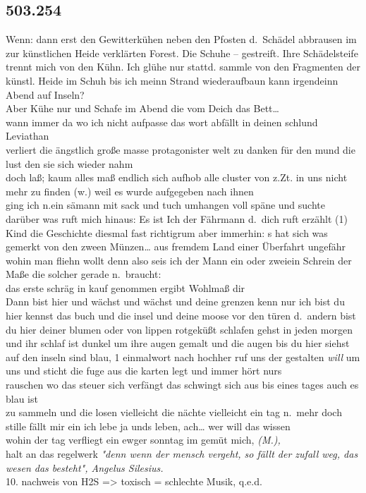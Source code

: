 \documentclass[
]{article}
\author{}
\date{\vspace{-2.5em}}
\begin{document}
\subsection{503.254}\label{section}

Wenn: dann erst den Gewitterkühen neben den Pfosten d.~Schädel abbrausen
im zur künstlichen Heide verklärten Forest. Die Schuhe -- gestreift.
Ihre Schädelsteife trennt mich von den Kühn. Ich glühe nur stattd.
sammle von den Fragmenten der künstl. Heide im Schuh bis ich meinn
Strand wiederaufbaun kann irgendeinn Abend auf Inseln?\\
Aber Kühe nur und Schafe im Abend die vom Deich das Bett\ldots{}\\
wann immer da wo ich nicht aufpasse das wort abfällt in deinen schlund
Leviathan\\
verliert die ängstlich große masse protagonister welt zu danken für den
mund die lust den sie sich wieder nahm\\
doch laß; kaum alles maß endlich sich aufhob alle cluster von z.Zt. in
uns nicht mehr zu finden (w.) weil es wurde aufgegeben nach ihnen\\
ging ich n.ein sämann mit sack und tuch umhangen voll späne und suchte
darüber was ruft mich hinaus: Es ist Ich der Fährmann d.~dich ruft
erzählt (1) Kind die Geschichte diesmal fast richtigrum aber immerhin:
\textquotesingle s hat sich was gemerkt von den zween Münzen\ldots{} aus
fremdem Land einer Überfahrt ungefähr wohin man fliehn wollt denn also
sei\textquotesingle s ich der Mann ein oder zwei\textquotesingle ein
Schrein der Maße die solcher gerade n.~braucht:\\
das erste schräg in kauf genommen ergibt Wohlmaß dir\\
Dann bist hier und wächst und wächst und deine grenzen kenn nur ich bist
du hier kennst das buch und die insel und deine moose vor den türen
d.~andern bist du hier deiner blumen oder von lippen rotgeküßt schlafen
gehst in jeden morgen und ihr schlaf ist dunkel um ihre augen gemalt und
die augen bis du hier siehst auf den inseln sind blau, 1 einmalwort nach
hochher ruf uns der gestalten \emph{will} um uns und sticht die fuge aus
die karten legt und immer hört nurs\\
rauschen wo das steuer sich verfängt das schwingt sich aus bis eines
tages auch es blau ist\\
zu sammeln und die losen vielleicht die nächte vielleicht ein tag
n.~mehr doch stille fällt mir ein ich lebe ja unds leben, ach\ldots{}
wer will das wissen\\
wohin der tag verfliegt ein ewger sonntag im gemüt mich, \emph{(M.),}\\
halt an das regelwerk \emph{"denn wenn der mensch vergeht, so fällt der
zufall weg, das wesen das besteht", Angelus Silesius.}\\
10. nachweis von H2S =\textgreater{} toxisch = schlechte Musik, q.e.d.
\end{document}
